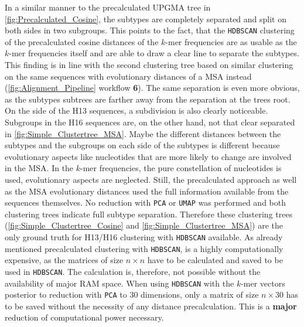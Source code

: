 In a similar manner to the precalculated \gls{UPGMA} tree in \autoref{fig:Precalculated_Cosine}, the subtypes are completely separated and split on both sides in two subgroups. This points to the fact, that the \texttt{HDBSCAN} clustering of the precalculated cosine distances of the $k$-mer frequencies are as usable as the $k$-mer frequencies itself and are able to draw a clear line to separate the subtypes. This finding is in line with the second clustering tree based on similar clustering on the same sequences with evolutionary distances of a \gls{MSA} instead (\autoref{fig:Alignment_Pipeline} workflow \textsf{\textbf{6}}). The same separation is even more obvious, as the subtypes subtrees are farther away from the separation at the trees root. On the side of the H13 sequences, a subdivision is also clearly noticeable. Subgroups in the H16 sequences are, on the other hand, not that clear separated in \autoref{fig:Simple_Clustertree_MSA}. Maybe the different distances between the subtypes and the subgroups on each side of the subtypes is different because evolutionary aspects like nucleotides that are more likely to change are involved in the \gls{MSA}. In the $k$-mer frequencies, the pure constellation of nucleotides is used, evolutionary aspects are neglected. Still, the precalculated approach as well as the \gls{MSA} evolutionary distances used the full information available from the sequences themselves. No reduction with \texttt{PCA} or \texttt{UMAP} was performed and both clustering trees indicate full subtype separation. Therefore these clustering trees (\autoref{fig:Simple_Clustertree_Cosine} and \autoref{fig:Simple_Clustertree_MSA}) are the only ground truth for H13/H16 clustering with \texttt{HDBSCAN} available. As already mentioned precalculated clustering with \texttt{HDBSCAN}, is a highly computationally expensive, as the matrices of size $n \times n$ have to be calculated and saved to be used in \texttt{HDBSCAN}. The calculation is, therefore, not possible without the availability of major RAM space. When using \texttt{HDBSCAN} with the $k$-mer vectors posterior to reduction with \texttt{PCA} to 30 dimensions, only a matrix of size $n\times 30$ has to be saved without the necessity of any distance precalculation. This is a \textbf{major} reduction of computational power necessary. 

\vspace{1em}

